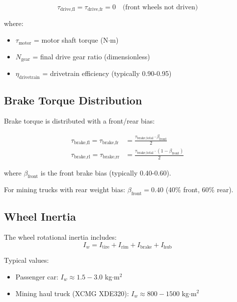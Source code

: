 \documentclass[11pt,a4paper]{article}
\begin{document}
\begin{equation}
\tau_{\text{drive,fl}} = \tau_{\text{drive,fr}} = 0 \quad \text{(front wheels not driven)}
\end{equation}

where:
\begin{itemize}
    \item $\tau_{\text{motor}}$ = motor shaft torque (N$\cdot$m)
    \item $N_{\text{gear}}$ = final drive gear ratio (dimensionless)
    \item $\eta_{\text{drivetrain}}$ = drivetrain efficiency (typically 0.90-0.95)
\end{itemize}

\subsection{Brake Torque Distribution}

Brake torque is distributed with a front/rear bias:

\begin{align}
\tau_{\text{brake,fl}} = \tau_{\text{brake,fr}} &= \frac{\tau_{\text{brake,total}} \cdot \beta_{\text{front}}}{2} \\
\tau_{\text{brake,rl}} = \tau_{\text{brake,rr}} &= \frac{\tau_{\text{brake,total}} \cdot (1 - \beta_{\text{front}})}{2}
\end{align}

where $\beta_{\text{front}}$ is the front brake bias (typically 0.40-0.60).

For mining trucks with rear weight bias: $\beta_{\text{front}} = 0.40$ (40\% front, 60\% rear).

\subsection{Wheel Inertia}

The wheel rotational inertia includes:
\begin{equation}
I_w = I_{\text{tire}} + I_{\text{rim}} + I_{\text{brake}} + I_{\text{hub}}
\end{equation}

Typical values:
\begin{itemize}
    \item Passenger car: $I_w \approx 1.5-3.0$ kg$\cdot$m$^2$
    \item Mining haul truck (XCMG XDE320): $I_w \approx 800-1500$ kg$\cdot$m$^2$
\end{itemize}
\end{document}
